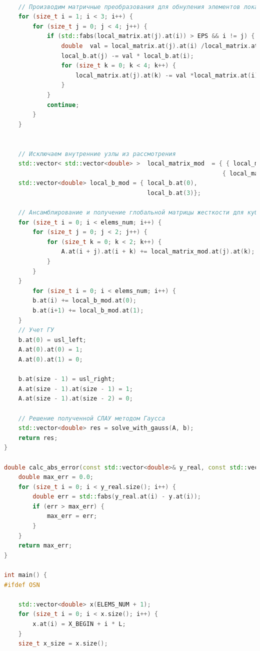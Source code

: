 \begin{lstlisting}[language=c++, label=prog,caption={\textit{Реализация МКЭ}}]
    
    // Производим матричные преобразования для обнуления элементов локальной матрицы жесткости, относящихся к внутренним узлам
    for (size_t i = 1; i < 3; i++) {
        for (size_t j = 0; j < 4; j++) {
            if (std::fabs(local_matrix.at(j).at(i)) > EPS && i != j) {
                double  val = local_matrix.at(j).at(i) /local_matrix.at(i).at(i);
                local_b.at(j) -= val * local_b.at(i);
                for (size_t k = 0; k < 4; k++) {
                    local_matrix.at(j).at(k) -= val *local_matrix.at(i).at(k);
                }
            }
            continue;
        }
    }
    
    
    // Исключаем внутренние узлы из рассмотрения
    std::vector< std::vector<double> >  local_matrix_mod  = { { local_matrix.at(0).at(0), local_matrix.at(0).at(3) },
                                                             { local_matrix.at(3).at(0), local_matrix.at(3).at(3) } };
    std::vector<double> local_b_mod = { local_b.at(0), 
                                        local_b.at(3)};
    
    // Ансамблирование и получение глобальной матрицы жесткости для кубического КЭ
    for (size_t i = 0; i < elems_num; i++) {
        for (size_t j = 0; j < 2; j++) {
            for (size_t k = 0; k < 2; k++) {
                A.at(i + j).at(i + k) += local_matrix_mod.at(j).at(k);
            }
        }
    }
        for (size_t i = 0; i < elems_num; i++) {
        b.at(i) += local_b_mod.at(0);
        b.at(i+1) += local_b_mod.at(1);
    }
    // Учет ГУ
    b.at(0) = usl_left;
    A.at(0).at(0) = 1;
    A.at(0).at(1) = 0;
    
    b.at(size - 1) = usl_right;
    A.at(size - 1).at(size - 1) = 1;
    A.at(size - 1).at(size - 2) = 0;
    
    // Решение полученной СЛАУ методом Гаусса
    std::vector<double> res = solve_with_gauss(A, b);
    return res;
}

double calc_abs_error(const std::vector<double>& y_real, const std::vector<double>& y) {
    double max_err = 0.0;
    for (size_t i = 0; i < y_real.size(); i++) {
        double err = std::fabs(y_real.at(i) - y.at(i));
        if (err > max_err) {
            max_err = err;
        }
    }
    return max_err;
}

int main() {
#ifdef OSN

    std::vector<double> x(ELEMS_NUM + 1);
    for (size_t i = 0; i < x.size(); i++) {
        x.at(i) = X_BEGIN + i * L;
    }
    size_t x_size = x.size();
    


\end{lstlisting}

